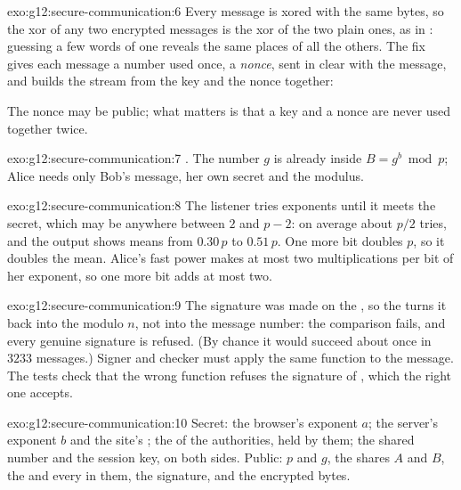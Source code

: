 \begin{solution}{exo:g12:secure-communication:6}
Every message is xored with the same bytes, so the xor of any two encrypted messages is the xor of the two plain
ones, as in : guessing a few words of one reveals the same places of all the others. The fix gives
each message a number used once, a \emph{nonce}, sent in clear with the message, and builds the stream from the key
and the nonce together:

\smallskip\noindent\hspace*{2em}

\smallskip\noindent The nonce may be public; what matters is that a key and a nonce are never used together twice.
\end{solution}

\begin{solution}{exo:g12:secure-communication:7}
. The number $g$ is already inside $B = g^b \bmod p$; Alice needs
only Bob's message, her own secret and the modulus.
\end{solution}

\begin{solution}{exo:g12:secure-communication:8}
The listener tries exponents until it meets the secret, which may be anywhere between $2$ and $p - 2$: on average
about $p/2$ tries, and the output shows means from $0.30\,p$ to $0.51\,p$. One more bit doubles $p$, so it doubles
the mean. Alice's fast power makes at most two multiplications per bit of her exponent, so one more bit adds at most
two.
\end{solution}

\begin{solution}{exo:g12:secure-communication:9}
The signature was made on the , so the  turns it back into the  modulo $n$, not into the
message number: the comparison fails, and every genuine signature is refused. (By chance it would succeed about once
in $3233$ messages.) Signer and checker must apply the same function to the message. The tests check that the wrong
function refuses the signature of , which the right one accepts.
\end{solution}

\begin{solution}{exo:g12:secure-communication:10}
Secret: the browser's exponent $a$; the server's exponent $b$ and the site's ; the  of the
authorities, held by them; the shared number and the session key, on both sides. Public: $p$ and $g$, the shares
$A$ and $B$, the  and every  in them, the signature, and the encrypted bytes.
\end{solution}


